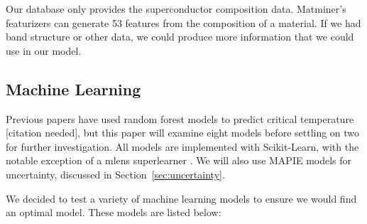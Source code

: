 \documentclass[twocolumn, nofootinbib, secnumarabic, amssymb, nobibnotes, aps, prd]{revtex4-2}
\begin{document}

Our database only provides the superconductor composition data. Matminer's featurizers can generate 53 features from the composition of a material. If we had band structure or other data, we could produce more information that we could use in our model.

\subsection{Machine Learning}

Previous papers have used random forest models to predict critical temperature [citation needed], but this paper will examine eight models before settling on two for further investigation. All models are implemented with Scikit-Learn, with the notable exception of a mlens superlearner \cite{scikit-learn, flennerhag:2017mlens}. We will also use MAPIE models for uncertainty, discussed in Section~\ref{sec:uncertainty}.

We decided to test a variety of machine learning models to ensure we would find an optimal model. These models are listed below:
\end{document}
